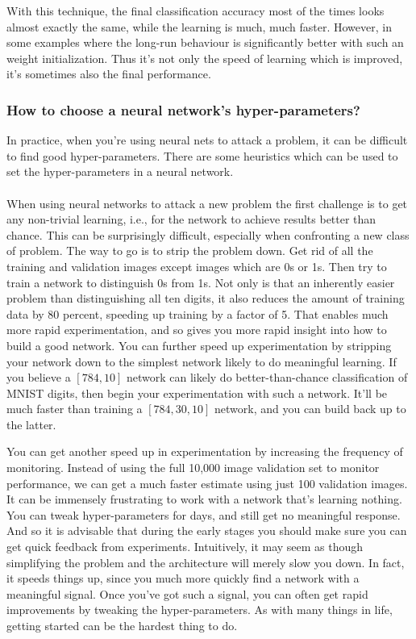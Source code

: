 With this technique, the final classification accuracy most of the times looks almost exactly the same, while the learning is much, much faster. However, in some examples where the long-run behaviour is significantly better with such an weight initialization. Thus it's not only the speed of learning which is improved, it's sometimes also the final performance.

\subsubsection{How to choose a neural network's hyper-parameters?}
In practice, when you're using neural nets to attack a problem, it can be difficult to find good hyper-parameters. There are some heuristics which can be used to set the hyper-parameters in a neural network.

\paragraph{} When using neural networks to attack a new problem the first challenge is to get any non-trivial learning, i.e., for the network to achieve results better than chance. This can be surprisingly difficult, especially when confronting a new class of problem.  The way to go is to strip the problem down. Get rid of all the training and validation images except images which are 0s or 1s. Then try to train a network to distinguish 0s from 1s. Not only is that an inherently easier problem than distinguishing all ten digits, it also reduces the amount of training data by 80 percent, speeding up training by a factor of 5. That enables much more rapid experimentation, and so gives you more rapid insight into how to build a good network. You can further speed up experimentation by stripping your network down to the simplest network likely to do meaningful learning. If you believe a $[784, 10]$ network can likely do better-than-chance classification of MNIST digits, then begin your experimentation with such a network. It'll be much faster than training a $[784, 30, 10]$ network, and you can build back up to the latter.

You can get another speed up in experimentation by increasing the frequency of monitoring. Instead of using the full 10,000 image validation set to monitor performance, we can get a much faster estimate using just 100 validation images. It can be immensely frustrating to work with a network that's learning nothing. You can tweak hyper-parameters for days, and still get no meaningful response. And so it is advisable that during the early stages you should make sure you can get quick feedback from experiments. Intuitively, it may seem as though simplifying the problem and the architecture will merely slow you down. In fact, it speeds things up, since you much more quickly find a network with a meaningful signal. Once you've got such a signal, you can often get rapid improvements by tweaking the hyper-parameters. As with many things in life, getting started can be the hardest thing to do.

